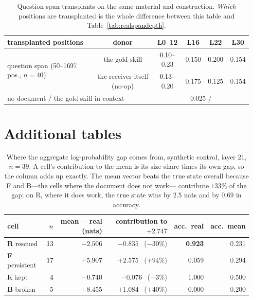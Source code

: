 \documentclass{article}
\begin{document}
\begin{table}[h]
\caption{Question-span transplants on the same material and construction.
\emph{Which} positions are transplanted is the whole difference between this
table and Table~\ref{tab:realspandepth}.}
\label{tab:realspan}
\centering
\small
\begin{tabular}{lccccc}
\toprule
transplanted positions & donor & L0--12 & L16 & L22 & L30 \\
\midrule
\multirow{2}{*}{question span (50--1697 pos., $n=40$)}
 & the gold skill   & 0.10--0.23 & 0.150 & 0.200 & 0.154 \\
 & the receiver itself (no-op) & 0.13--0.20 & 0.175 & 0.125 & 0.154 \\
\midrule
\multicolumn{2}{l}{no document / the gold skill in context}
 & \multicolumn{4}{c}{0.025 \quad / \quad 0.950} \\
\bottomrule
\end{tabular}
\end{table}

\clearpage

\section{Additional tables}

\begin{table}[h]
\caption{Where the aggregate log-probability gap comes from, synthetic control,
layer 21, $n=39$. A cell's contribution to the mean is its size share times its
own gap, so the column adds up exactly. The mean vector beats the true state
overall because F and B---the cells where the document does not work---%
contribute $133\%$ of the gap; on R, where it does work, the true state wins by
$2.5$ nats and by $0.69$ in accuracy.}
\label{tab:cells}
\centering
\small
\begin{tabular}{lrrrrr}
\toprule
cell & $n$ & mean $-$ real (nats) & contribution to $+2.747$ & acc.\ real & acc.\ mean \\
\midrule
\textbf{R} rescued    & 13 & $-2.506$ & $-0.835$ \ ($-30\%$) & \textbf{0.923} & 0.231 \\
\textbf{F} persistent & 17 & $+5.907$ & $+2.575$ \ ($+94\%$) & 0.059 & 0.294 \\
K kept                &  4 & $-0.740$ & $-0.076$ \ ($-3\%$)  & 1.000 & 0.500 \\
\textbf{B} broken     &  5 & $+8.455$ & $+1.084$ \ ($+40\%$) & 0.000 & 0.200 \\
\bottomrule
\end{tabular}
\end{table}
\end{document}
